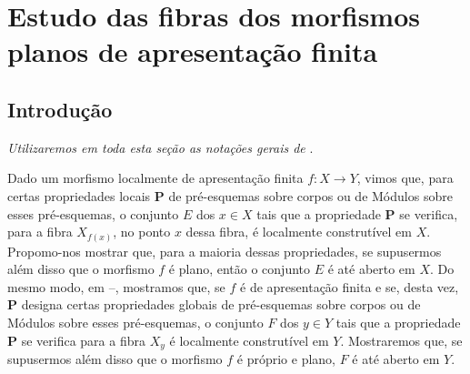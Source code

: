 \section{Estudo das fibras dos morfismos planos de apresentação finita}
\label{section:IV.12}

\setcounter{subsection}{-1}
\subsection{Introdução}
\label{subsection:IV.12.0}

\emph{Utilizaremos em toda esta seção as notações gerais de}
.

\begin{env}[12.0.1]
\label{IV.12.0.1}
Dado um morfismo localmente de apresentação finita $f:X\to Y$, vimos
 que, para certas propriedades locais $\mathbf P$ de
pré-esquemas sobre corpos ou de Módulos sobre esses pré-esquemas, o
conjunto $E$ dos $x\in X$ tais que a propriedade $\mathbf P$ se verifica,
para a fibra $X_{f(x)}$, no ponto $x$ dessa fibra, é localmente
construtível em $X$. Propomo-nos mostrar que, para a maioria dessas
propriedades, se supusermos além disso que o morfismo $f$ é plano,
então o conjunto $E$ é até aberto em $X$. Do mesmo modo, em
–, mostramos que, se $f$ é de apresentação
finita e se, desta vez, $\mathbf P$ designa certas propriedades globais
de pré-esquemas sobre corpos ou de Módulos sobre esses pré-esquemas, o
conjunto $F$ dos $y\in Y$ tais que a propriedade $\mathbf P$ se
verifica para a fibra $X_y$ é localmente construtível em $Y$.
Mostraremos que, se supusermos além disso que o morfismo $f$ é
próprio e plano, $F$ é até aberto em $Y$.
\end{env}

